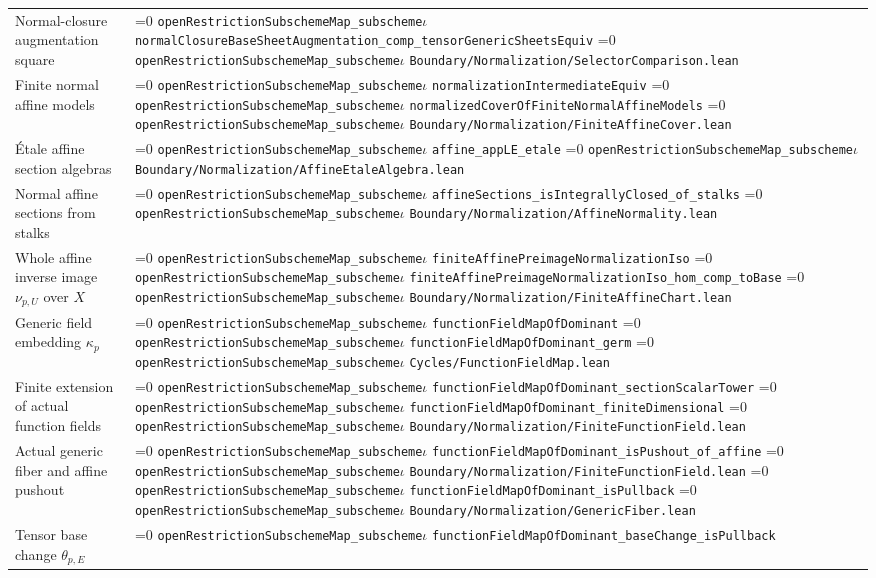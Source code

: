 \documentclass[11pt]{article}
\theoremstyle{definition}
\theoremstyle{remark}
\newcommand{\leanpath}[1]{%
  \ifnum\pdfstrcmp{\detokenize{#1}}%
      {\detokenize{openRestrictionSubschemeMap_subschemeι}}=0
    \texttt{\nolinkurl{openRestrictionSubschemeMap_subscheme}}\ensuremath{\iota}%
  \else
    \texttt{\nolinkurl{#1}}%
  \fi}
\begin{document}
\begin{longtable}{@{}>{\raggedright\arraybackslash}p{}
                >{\raggedright\arraybackslash}p{}@{}}
Normal-closure augmentation square &
\leanpath{normalClosureBaseSheetAugmentation_comp_tensorGenericSheetsEquiv}\newline
\leanpath{Boundary/Normalization/SelectorComparison.lean}\\
Finite normal affine models &
\leanpath{normalizationIntermediateEquiv}\newline
\leanpath{normalizedCoverOfFiniteNormalAffineModels}\newline
\leanpath{Boundary/Normalization/FiniteAffineCover.lean}\\
\'{E}tale affine section algebras &
\leanpath{affine_appLE_etale}\newline
\leanpath{Boundary/Normalization/AffineEtaleAlgebra.lean}\\
Normal affine sections from stalks &
\leanpath{affineSections_isIntegrallyClosed_of_stalks}\newline
\leanpath{Boundary/Normalization/AffineNormality.lean}\\
Whole affine inverse image \(\nu_{p,U}\) over \(X\) &
\leanpath{finiteAffinePreimageNormalizationIso}\newline
\leanpath{finiteAffinePreimageNormalizationIso_hom_comp_toBase}\newline
\leanpath{Boundary/Normalization/FiniteAffineChart.lean}\\
Generic field embedding \(\kappa_p\) &
\leanpath{functionFieldMapOfDominant}\newline
\leanpath{functionFieldMapOfDominant_germ}\newline
\leanpath{Cycles/FunctionFieldMap.lean}\\
Finite extension of actual function fields &
\leanpath{functionFieldMapOfDominant_sectionScalarTower}\newline
\leanpath{functionFieldMapOfDominant_finiteDimensional}\newline
\leanpath{Boundary/Normalization/FiniteFunctionField.lean}\\
Actual generic fiber and affine pushout &
\leanpath{functionFieldMapOfDominant_isPushout_of_affine}\newline
\leanpath{Boundary/Normalization/FiniteFunctionField.lean}\newline
\leanpath{functionFieldMapOfDominant_isPullback}\newline
\leanpath{Boundary/Normalization/GenericFiber.lean}\\
Tensor base change \(\theta_{p,E}\) &
\leanpath{functionFieldMapOfDominant_baseChange_isPullback}\newline

\end{longtable}
\end{document}
